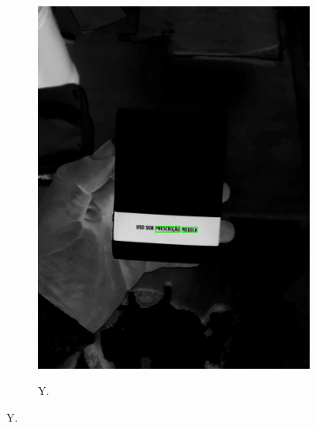 \begin{figure}[htb]
\begin{subfigure}[t]{0.21\textwidth}
        \includegraphics[width=\linewidth]{../pictures/tysabri_cmyk_m_only_boxes.jpg}
    \end{subfigure}
    \hfill
    \begin{subfigure}[t]{0.21\textwidth}
        \centering
        \caption{Y.}
        \label{fig:foto:versoes:2:Y:boxes}

\end{subfigure}
\end{figure}
